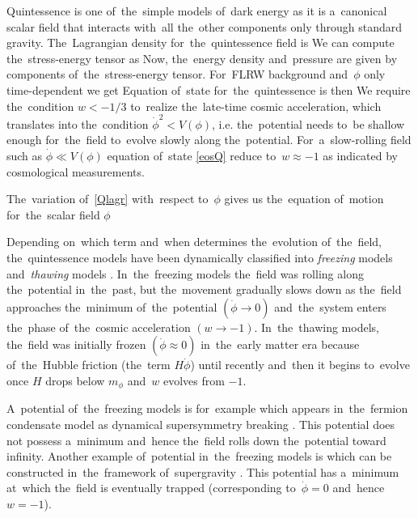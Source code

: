 Quintessence is one of~the~simple models of~dark energy as it is a~canonical scalar field that interacts with~all the~other components only through standard gravity. The~Lagrangian density for~the~quintessence field is
We can compute the~stress-energy tensor as
Now, the~energy density and~pressure are given by components of~the~stress-energy tensor. For~FLRW background and~$\phi$ only time-dependent we get
Equation of~state for~the~quintessence is then
We require the~condition $w<-1/3$ to~realize the~late-time cosmic acceleration, which translates into the~condition  $\dot{\phi}^2<V(\phi)$, i.e. the~potential needs to~be shallow enough for~the~field to~evolve slowly along the~potential. For~a~slow-rolling field such as $\dot{\phi}\ll V(\phi)$ equation of~state \eqref{eosQ} reduce to~$w\approx-1$ as indicated by cosmological measurements.

The~variation of~\eqref{Qlagr} with~respect to~$\phi$ gives us the~equation of~motion for~the~scalar field $\phi$

Depending on~which term and~when determines the~evolution of~the~field, the~quintessence models have been dynamically classified into \textit{freezing} models and~\textit{thawing} models \parencite{2005PhRvL..95n1301C}. In~the~freezing models the~field was rolling along the~potential in~the~past, but the~movement gradually slows down as the~field approaches the~minimum of~the~potential $(\dot{\phi}\rightarrow0)$ and~the~system enters the~phase of~the~cosmic acceleration $(w\rightarrow-1)$. In~the~thawing models, the~field was initially frozen $(\dot{\phi}\approx0)$ in~the~early matter era because of~the~Hubble friction (the~term $H\dot{\phi}$) until recently and~then it begins to~evolve once $H$ drops below $m_\phi$ and~$w$ evolves from $-1$.

A~potential of~the~freezing models is for~example
which appears in~the~fermion condensate model as dynamical supersymmetry breaking \parencite{1999PhRvD..60f3502B}. This potential does not possess a~minimum and~hence the~field rolls down the~potential toward infinity. Another example of~potential in~the~freezing models is
which can be constructed in~the~framework of~supergravity \parencite{1999PhLB..468...40B}. This potential has a~minimum at~which the~field is eventually trapped (corresponding to~$\dot{\phi}=0$ and~hence $w=-1$).


